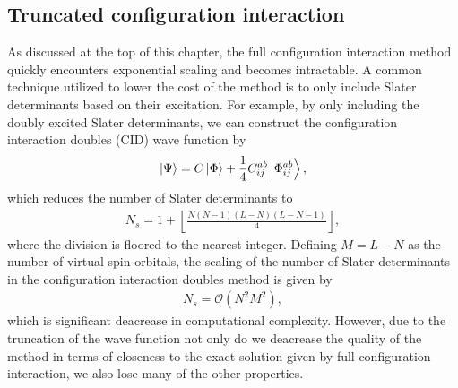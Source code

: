        \subsection{Truncated configuration interaction}
            \label{sub:truncated-configuration-interaction}
            As discussed at the top of this chapter, the full configuration
            interaction method quickly encounters exponential scaling and
            becomes intractable.
            A common technique utilized to lower the cost of the method is to
            only include Slater determinants based on their excitation.
            For example, by only including the doubly excited Slater
            determinants, we can construct the configuration interaction doubles
            (CID) wave function by
            \begin{align}
                \ket{\Psi} = C\ket{\Phi}
                + \frac{1}{4} C^{ab}_{ij} \ket{\Phi^{ab}_{ij}},
            \end{align}
            which reduces the number of Slater determinants to
            \begin{align}
                N_s = 1 + \left\lfloor\frac{N(N - 1)(L - N)(L - N -
                1)}{4}\right\rfloor,
            \end{align}
            where the division is floored to the nearest integer.
            Defining $M = L - N$ as the number of virtual spin-orbitals, the
            scaling of the number of Slater determinants in the configuration
            interaction doubles method is given by
            \begin{align}
                N_s = \mathcal{O}(N^2 M^2),
            \end{align}
            which is significant deacrease in computational complexity.
            However, due to the truncation of the wave function not only do we
            deacrease the quality of the method in terms of closeness to the
            exact solution given by full configuration interaction, we also lose
            many of the other properties.

